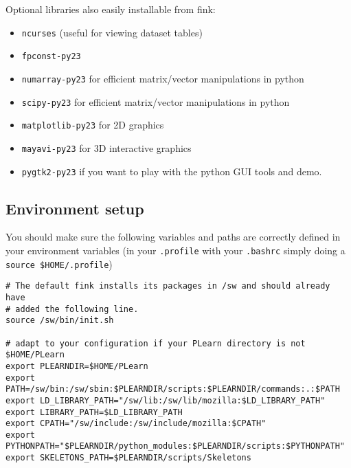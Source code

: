 \documentclass[11pt]{book}
\begin{document}
Optional libraries also easily installable from fink:
\begin{itemize}
\item {\tt ncurses}  (useful for viewing dataset tables)
\item {\tt fpconst-py23}
\item {\tt numarray-py23} for efficient matrix/vector manipulations in python
\item {\tt scipy-py23} for efficient matrix/vector manipulations in python
\item {\tt matplotlib-py23} for 2D graphics
\item {\tt mayavi-py23} for 3D interactive graphics
\item {\tt pygtk2-py23} if you want to play with the
  python GUI tools and demo.
\end{itemize}




\subsection{Environment setup}

You should make sure the following variables and paths are correctly defined in your
environment variables (in your {\tt .profile} with your {\tt .bashrc}
simply doing a \verb!source $HOME/.profile!)

\begin{verbatim}
# The default fink installs its packages in /sw and should already have
# added the following line.
source /sw/bin/init.sh

# adapt to your configuration if your PLearn directory is not $HOME/PLearn
export PLEARNDIR=$HOME/PLearn
export PATH=/sw/bin:/sw/sbin:$PLEARNDIR/scripts:$PLEARNDIR/commands:.:$PATH
export LD_LIBRARY_PATH="/sw/lib:/sw/lib/mozilla:$LD_LIBRARY_PATH"
export LIBRARY_PATH=$LD_LIBRARY_PATH
export CPATH="/sw/include:/sw/include/mozilla:$CPATH"
export PYTHONPATH="$PLEARNDIR/python_modules:$PLEARNDIR/scripts:$PYTHONPATH"
export SKELETONS_PATH=$PLEARNDIR/scripts/Skeletons
\end{verbatim}
\end{document}
